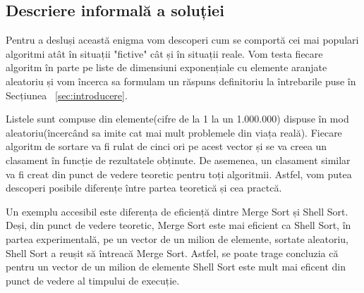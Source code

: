 \documentclass[12pt]{article}
\begin{document}
\subsection{Descriere informală a soluției}
Pentru a desluși această enigma vom descoperi cum se comportă cei mai populari algoritmi atât în situații "fictive" cât și în situații reale. Vom testa fiecare algoritm în parte pe liste de dimensiuni exponențiale cu elemente aranjate aleatoriu și vom încerca sa formulam un răspuns definitoriu la întrebarile puse în Secțiunea ~\ref{sec:introducere}.

Listele sunt compuse din elemente(cifre de la 1 la un 1.000.000) dispuse în mod aleatoriu(încercând sa imite cat mai mult problemele din viața reală). Fiecare algoritm de sortare va fi rulat de cinci ori pe acest vector și se va creea un clasament în funcție de rezultatele obținute.
De asemenea, un clasament similar va fi creat din punct de vedere teoretic pentru toți algoritmii. Astfel, vom putea descoperi posibile diferențe între partea teoretică și cea practcă.

Un exemplu accesibil este diferența de eficiență dintre Merge Sort și Shell Sort. Deși, din punct de vedere teoretic, Merge Sort este mai eficient ca Shell Sort, în partea experimentală, pe un vector de un milion de elemente, sortate aleatoriu, Shell Sort a reușit să întreacă Merge Sort. Astfel, se poate trage concluzia că pentru un vector de un milion de elemente Shell Sort este mult mai eficent din punct de vedere al timpului de execuție.
\end{document}
